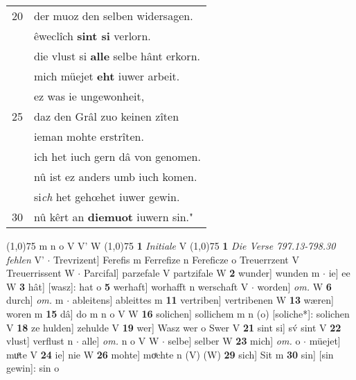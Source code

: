 \documentclass[8pt,a4paper,notitlepage]{article}
\begin{document}
\begin{table}[ht]
\begin{minipage}[t]{0.5\linewidth}
\begin{tabular}{rl}
20 & der muoz den selben widersagen.\\ 
 & êweclîch \textbf{sint si} verlorn.\\ 
 & die vlust si \textbf{alle} selbe hânt erkorn.\\ 
 & mich müejet \textbf{eht} iuwer arbeit.\\ 
 & ez was ie ungewonheit,\\ 
25 & daz den Grâl zuo keinen zîten\\ 
 & ieman mohte erstrîten.\\ 
 & ich het iuch gern dâ von genomen.\\ 
 & nû ist ez anders umb iuch komen.\\ 
 & si\textit{ch} het gehœhet iuwer gewin.\\ 
30 & nû kêrt an \textbf{diemuot} iuwern sin."\\ 
\end{tabular}
\scriptsize
\line(1,0){75} \newline
m n o V V' W \newline
\line(1,0){75} \newline
\textbf{1} \textit{Initiale} V  \newline
\line(1,0){75} \newline
\textbf{1} \textit{Die Verse 797.13-798.30 fehlen} V'   $\cdot$ Trevrizent] Ferefis m Ferrefize n Fereficze o Treuerrzent V Treuerrissent W  $\cdot$ Parcifal] parzefale V partzifale W \textbf{2} wunder] wunden m  $\cdot$ ie] ee W \textbf{3} hât] [wasz]: hat o \textbf{5} werhaft] worhafft n werschaft V  $\cdot$ worden] \textit{om.} W \textbf{6} durch] \textit{om.} m  $\cdot$ ableitens] ableittes m \textbf{11} vertriben] vertribenen W \textbf{13} wæren] woren m \textbf{15} dâ] do m n o V W \textbf{16} solichen] sollichem m n (o) [soliche*]: solichen  V \textbf{18} ze hulden] zehulde V \textbf{19} wer] Wasz wer o Swer V \textbf{21} sint si] sv́ sint V \textbf{22} vlust] verflust n  $\cdot$ alle] \textit{om.} n o V W  $\cdot$ selbe] selber W \textbf{23} mich] \textit{om.} o  $\cdot$ müejet] muͦte V \textbf{24} ie] nie W \textbf{26} mohte] moͯchte n (V) (W) \textbf{29} sich] Sit m \textbf{30} sin] [sin gewin]: sin o \newline
\end{minipage}
\end{table}
\newpage
\end{document}
